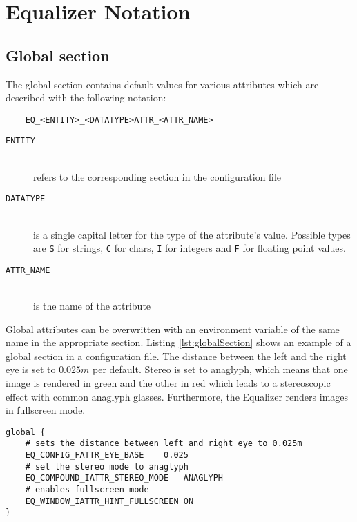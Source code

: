\chapter{Equalizer Notation}
\section{Global section}
\label{sec:appendixGlobalSection}

The global section contains default values for various attributes which are described with the following notation:

\begin{verbatim}
	EQ_<ENTITY>_<DATATYPE>ATTR_<ATTR_NAME>
\end{verbatim}

\begin{description}
	\item[\texttt{ENTITY}] \hfill\\refers to the corresponding section in the configuration file
	\item[\texttt{DATATYPE}] \hfill\\is a single capital letter for the type of the attribute's value. Possible types are \texttt{S} for strings, \texttt{C} for chars, \texttt{I} for integers and \texttt{F} for floating point values.
	\item[\texttt{ATTR\_NAME}] \hfill\\is the name of the attribute
\end{description}

Global attributes can be overwritten with an environment variable of the same name in the appropriate section. Listing \ref{lst:globalSection} shows an example of a global section in a configuration file. The distance between the left and the right eye is set to $0.025m$ per default. Stereo is set to anaglyph, which means that one image is rendered in green and the other in red which leads to a stereoscopic effect with common anaglyph glasses. Furthermore, the Equalizer renders images in fullscreen mode.
\begin{lstlisting}[language=vrml,caption={Example for a global section in a configuration file},label={lst:globalSection}]
global {
	# sets the distance between left and right eye to 0.025m
	EQ_CONFIG_FATTR_EYE_BASE	0.025		
	# set the stereo mode to anaglyph
	EQ_COMPOUND_IATTR_STEREO_MODE	ANAGLYPH
	# enables fullscreen mode
	EQ_WINDOW_IATTR_HINT_FULLSCREEN	ON
}
\end{lstlisting}

